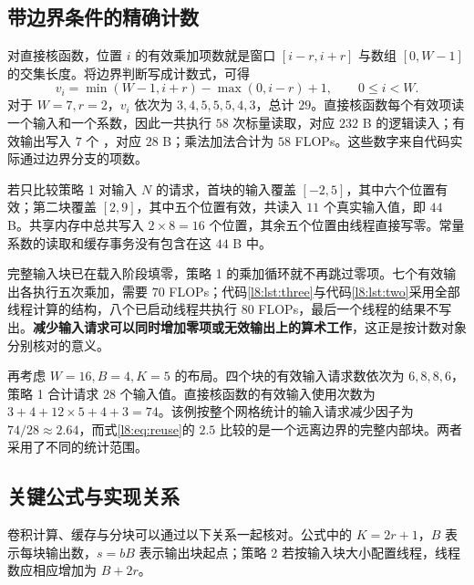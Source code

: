 \subsection{带边界条件的精确计数}
对直接核函数，位置 $i$ 的有效乘加项数就是窗口 $[i-r,i+r]$ 与数组 $[0,W-1]$ 的交集长度。将边界判断写成计数式，可得
\begin{equation}
 v_i=\min(W-1,i+r)-\max(0,i-r)+1,
 \qquad 0\le i<W.
\label{l8:eq:validcount}
\end{equation}
对于 $W=7,r=2$，$v_i$ 依次为 $3,4,5,5,5,4,3$，总计 $29$。直接核函数每个有效项读一个输入和一个系数，因此一共执行 $58$ 次标量读取，对应 $232$ B 的逻辑读入；有效输出写入 $7$ 个 \mbox{}，对应 $28$ B；乘法加法合计为 $58$ FLOPs。这些数字来自代码实际通过边界分支的项数。

若只比较策略 1 对输入 $N$ 的请求，首块的输入覆盖 $[-2,5]$，其中六个位置有效；第二块覆盖 $[2,9]$，其中五个位置有效，共读入 $11$ 个真实输入值，即 $44$ B。共享内存中总共写入 $2\times8=16$ 个位置，其余五个位置由线程直接写零。常量系数的读取和缓存事务没有包含在这 $44$ B 中。

完整输入块已在载入阶段填零，策略 1 的乘加循环就不再跳过零项。七个有效输出各执行五次乘加，需要 $70$ FLOPs；代码\ref{l8:lst:three}与代码\ref{l8:lst:two}采用全部线程计算的结构，八个已启动线程共执行 $80$ FLOPs，最后一个线程的结果不写出。\textbf{减少输入请求可以同时增加零项或无效输出上的算术工作}，这正是按计数对象分别核对的意义。

再考虑 $W=16,B=4,K=5$ 的布局。四个块的有效输入请求数依次为 $6,8,8,6$，策略 1 合计请求 $28$ 个输入值。直接核函数的有效输入使用次数为 $3+4+12\times5+4+3=74$。该例按整个网格统计的输入请求减少因子为 $74/28\approx2.64$，而式\eqref{l8:eq:reuse}的 $2.5$ 比较的是一个远离边界的完整内部块。两者采用了不同的统计范围。

\subsection{关键公式与实现关系}
卷积计算、缓存与分块可以通过以下关系一起核对。公式中的 $K=2r+1$，$B$ 表示每块输出数，$s=bB$ 表示输出块起点；策略 2 若按输入块大小配置线程，线程数应相应增加为 $B+2r$。

